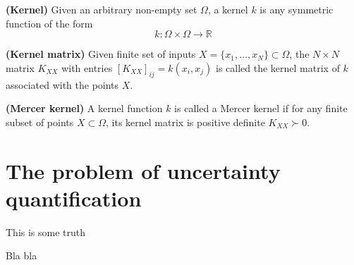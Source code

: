 \begin{definition}
	\textbf{(Kernel)} Given an arbitrary non-empty set $\Omega$, a kernel $k$ is any symmetric function of the form
	\begin{equation}
		k: \Omega \times \Omega \rightarrow \mathbb{R}
	\end{equation}
\end{definition}


\begin{definition}
	\textbf{(Kernel matrix)} Given finite set of inputs $X = \{x_1,\dots,x_N\} \subset \Omega$, the $N \times N$ matrix $K_{XX}$ with entries $[K_{XX}]_{ij} = k(x_i,x_j)$ is called the kernel matrix of $k$ associated with the points $X$.
\end{definition}


\begin{definition}
	\textbf{(Mercer kernel)} A kernel function $k$ is called a Mercer kernel if for any finite subset of points $X \subset \Omega$, its kernel matrix is positive definite $K_{XX} \succ 0$.
\end{definition}


\section{The problem of uncertainty quantification}

\begin{theorem}
	This is some truth
\end{theorem}

Bla bla
